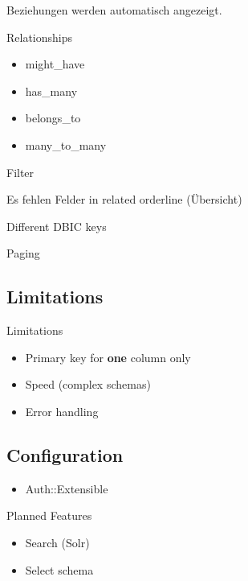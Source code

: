 Beziehungen werden automatisch angezeigt.

\begin{frame}{Relationships}
\begin{itemize}
\item might\_have
\item has\_many
\item belongs\_to
\item many\_to\_many
\end{itemize}
\end{frame}

Filter

Es fehlen Felder in related orderline (Übersicht)

Different DBIC keys

Paging

\subsection{Limitations}
\begin{frame}{Limitations}
\begin{itemize}
\item Primary key for \textbf{one} column only
\item Speed (complex schemas)
\item Error handling
\end{itemize}
\end{frame}

\subsection{Configuration}
\begin{frame}
\begin{itemize}
\item Auth::Extensible
\end{itemize}
\end{frame}

\begin{frame}{Planned Features}
\begin{itemize}
\item Search (Solr)
\item Select schema
\end{itemize}
\end{frame}

